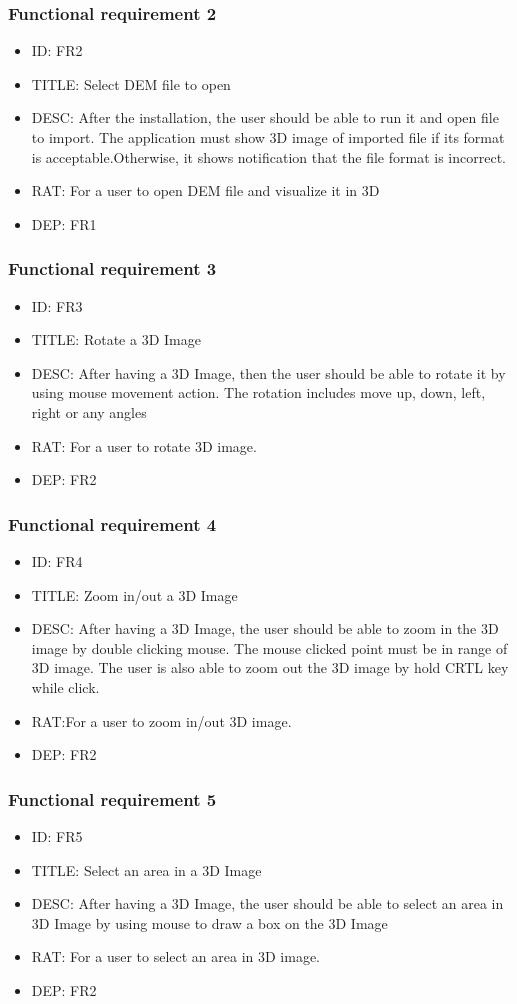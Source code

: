 \documentclass[11pt]{article}
\begin{document}
\subsubsection{Functional requirement 2}
\begin{itemize}
\item ID: FR2
\item TITLE: Select DEM file to open
\item DESC: After the installation, the user should be able to run it and open file to import. The application must show 3D image of imported file if its format is acceptable.Otherwise, it shows notification that the file format is incorrect.
\item RAT: For a user to open DEM file and visualize it in 3D
\item DEP: FR1
\end{itemize}
\subsubsection{Functional requirement 3}
\begin{itemize}
\item ID: FR3
\item TITLE: Rotate a 3D Image
\item DESC: After having a 3D Image, then the user should be able to rotate it by using mouse movement action. The rotation includes move up, down, left, right or any angles
\item RAT: For a user to rotate 3D image.
\item DEP: FR2
\end{itemize}
\subsubsection{Functional requirement 4}
\begin{itemize}
\item ID: FR4
\item TITLE: Zoom in/out a 3D Image
\item DESC: After having a 3D Image, the user should be able to zoom in the 3D image by double clicking mouse. The mouse clicked point must be in range of 3D image. The user is also able to zoom out the 3D image by hold CRTL key while click.
\item RAT:For a user to zoom in/out 3D image.
\item DEP: FR2
\end{itemize}
\subsubsection{Functional requirement 5}
\begin{itemize}
\item ID: FR5
\item TITLE: Select an area in a 3D Image
\item DESC: After having a 3D Image, the user should be able to select an area in 3D Image by using mouse to draw a box on the 3D Image
\item RAT: For a user to select an area in 3D image.
\item DEP: FR2
\end{itemize}
\end{document}
